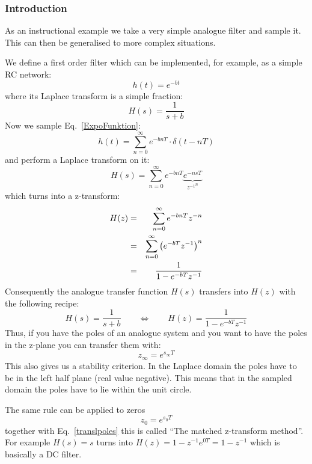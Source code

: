\documentclass[12pt,a4paper]{article}
\begin{document}
\subsubsection{Introduction}
As an instructional example we take a very simple analogue filter and
sample it. This can then be generalised to more complex
situations.

We define a first order filter which can be implemented, for example, as
a simple RC network:
\begin{equation}
h(t)=e^{-bt}
\label{ExpoFunktion}
\end{equation}
where its Laplace transform is a simple fraction:
\begin{equation}
H(s)=\frac{1}{s+b}
\end{equation}
Now we sample Eq.~\ref{ExpoFunktion}:
\begin{equation}
h(t)=\sum_{n=0}^\infty e^{-bnT} \cdot \delta(t-nT)
\end{equation}
and perform a Laplace transform on it:
\begin{equation}
H(s) = \sum_{n=0}^\infty e^{-bnT} \underbrace{e^{-nsT}}_{{z^{-1}}^n}
\end{equation}
which turns into a z-transform:
\begin{eqnarray}
H(z)&=&\sum_{n=0}^\infty e^{-bnT} z^{-n} \\
    &=&\sum_{n=0}^\infty {\left(e^{-bT} z^{-1}\right)}^n \\
    &=&{1\over 1-e^{-bT} z^{-1}}  \label{IIReq}
\end{eqnarray}
Consequently the analogue transfer function $H(s)$
transfers into $H(z)$ with the following recipe:
\begin{equation}
H(s)=\frac{1}{s+b} \qquad\Leftrightarrow\qquad
H(z)=\frac{1}{1-e^{-bT} z^{-1}} \label{impInv}
\end{equation}
Thus, if you have the poles of an analogue system and you want
to have the poles in the z-plane you can transfer them with:
\begin{equation}
z_\infty=e^{s_\infty T}
\label{translpoles}
\end{equation}
This also gives us a stability criterion. In the Laplace domain
the poles have to be in the left half plane (real value negative).
This means that in the sampled domain the poles have to lie within
the unit circle.

The same rule can be applied to zeros
\begin{equation}
z_0=e^{s_0 T} \label{matchedz}
\label{transzeros}
\end{equation}
together with Eq.~\ref{translpoles} this is called ``The matched
z-transform method''. For example $H(s)=s$ turns into
$H(z)=1-z^{-1}e^{0T}=1-z^{-1}$ which is basically a DC filter.
\end{document}
